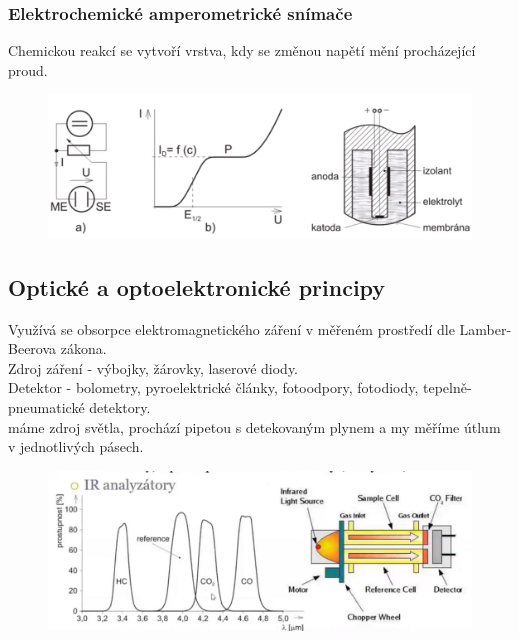 \subsubsection*{Elektrochemické amperometrické snímače}
Chemickou reakcí se vytvoří vrstva, kdy se změnou napětí mění procházející proud.\\
\begin{figure}[h!]
    \centering
    \includegraphics[scale = 0.2]{img/Amperomet.png}
\end{figure}

\subsection{Optické a optoelektronické principy}
Využívá se obsorpce elektromagnetického záření v měřeném prostředí dle Lamber-Beerova zákona.\\
Zdroj záření - výbojky, žárovky, laserové diody.\\
Detektor - bolometry, pyroelektrické články, fotoodpory, fotodiody, tepelně-pneumatické detektory.\\
máme zdroj světla, prochází pipetou s detekovaným plynem a my měříme útlum v jednotlivých pásech.\\
\begin{figure}[h!]
    \centering
    \includegraphics[scale = 0.2]{img/OptPrinc.png}
\end{figure}

